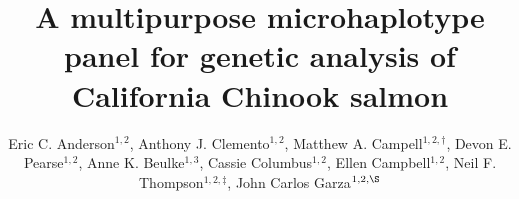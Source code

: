 

\newcommand{\myTitle}{A multipurpose microhaplotype panel for genetic analysis of California Chinook salmon}
\title{\myTitle}

\newcommand{\myAuthors}{Eric C. Anderson$^{1,\S}$, Anthony J. Clemento$^{1,2}$, Matthew A. Campell$^{1,2\dagger}$, Devon E. Pearse$^{1,2}$, Anne K. Beulke$^{1,3}$, Cassie Columbus$^{1,2}$, Ellen Campbell$^{1,2}$, Neil F. Thompson$^{1,2\ddag}$, John Carlos Garza$^{1,2,\S}$}
\author{Eric C. Anderson$^{1,2}$, Anthony J. Clemento$^{1,2}$, Matthew A. Campell$^{1,2,\dagger}$, Devon E. Pearse$^{1,2}$, Anne K. Beulke$^{1,3}$, Cassie Columbus$^{1,2}$, Ellen Campbell$^{1,2}$, Neil F. Thompson$^{1,2,\ddag}$, John Carlos Garza$^{1,2,\S}$}


\newcommand{\myAffiliations}{
$^1$Southwest Fisheries Science Center, National Marine Fisheries Service, NOAA, Santa Cruz, California, USA. $^2$Institute for Marine Sciences, University of California, Santa Cruz, USA. $^3$Department of Ocean Sciences, University of California, California, Santa Cruz, USA. $^\dagger$Current address: Centre for Carbon, Water and Food, The University of Sydney, 380 Werombi Road, NSW 2570, Australia. $^\ddag$Current address: Pacific Shellfish Research Unit, Agricultural Research Service, US Department of Agriculture, Newport, Oregon, USA.
}

\renewcommand{\AuthorAddresses}{\myAffiliations}

\renewcommand{\KeyWords}{Genetic stock identfication, population assignment, parentage based tagging, amplicon sequencing}

\renewcommand{\CorrespondingAuthor}{eric.anderson@noaa.gov,~carlos.garza@noaa.gov}


\newcommand{\myEmailAddress}{eric.anderson@noaa.gov,~carlos.garza@noaa.gov}
\newcommand{\myEmailFootnote}{$^\S$}

\newcommand{\myCopyright}{\copyright US Federal Government work in the public domain in the USA}

\newcommand{\myRunningTitle}{Microhaplotypes for California Chinook salmon}
\renewcommand{\RunningTitle}{\myRunningTitle}

\newcommand{\myRunningAuthor}{Anderson et al.}

